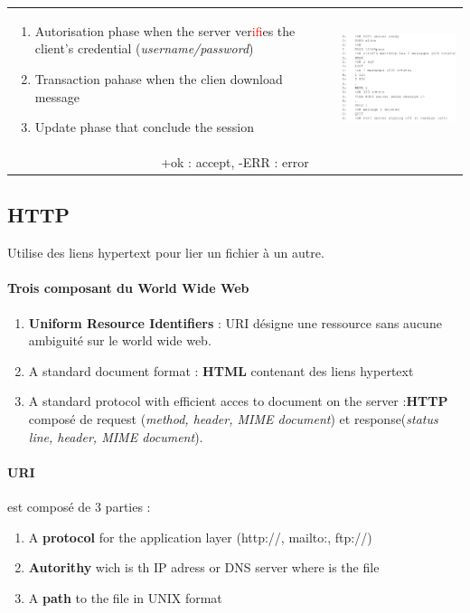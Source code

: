\begin{tabular}{m{9cm}m{6cm}}
\begin{enumerate}
    \item Autorisation phase when the server ver\textcolor{red}{if}ies the client's credential 
        (\textit{username/password})
    \item Transaction pahase when the clien download message
    \item Update phase that conclude the session
\end{enumerate}
&
\includegraphics[width=7cm]{pop.png} \\
\multicolumn{2}{c}{+ok : accept, -ERR : error}
\end{tabular}


\subsection{HTTP}
Utilise des liens hypertext pour lier un fichier à un autre.

\paragraph{Trois composant du \textbf{World Wide Web}}
\begin{enumerate}
    \item \textbf{Uniform Resource Identifiers} : URI désigne une ressource sans aucune ambiguité
sur le world wide web.
    \item A standard document format : \textbf{HTML} contenant des liens hypertext
    \item A standard protocol with efficient acces to document on the server :\textbf{HTTP} composé de request (\textit{method, header, MIME document}) et response(\textit{status line, header, MIME document}).
\end{enumerate}

\paragraph{\textbf{URI}} est composé de 3 parties :
\begin{enumerate}
    \item A \textbf{protocol} for the application layer (http://, mailto:, ftp://)
    \item \textbf{Autorithy} wich is th IP adress or DNS server where is the file
    \item A \textbf{path} to the file in UNIX format
\end{enumerate}

